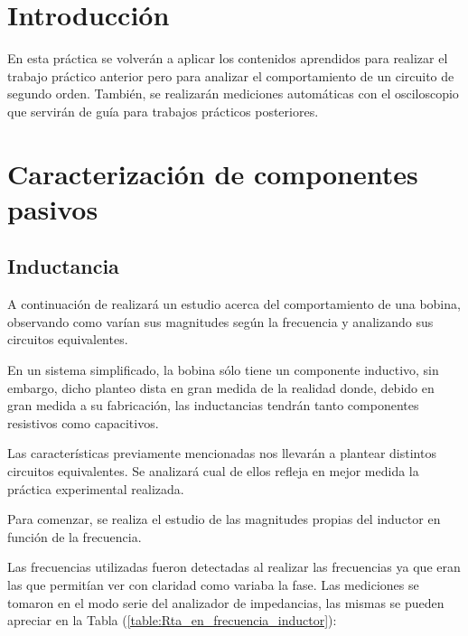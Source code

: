 \documentclass[11pt, a4paper]{article}
\begin{document}




\section{Introducción}
En esta práctica se volverán a aplicar los contenidos aprendidos para realizar el trabajo práctico anterior pero para analizar el comportamiento de un circuito de segundo orden. También, se realizarán mediciones automáticas con el osciloscopio que servirán de guía para trabajos prácticos posteriores.

\section{Caracterización de componentes pasivos}

\subsection{Inductancia}
A continuación de realizará un estudio acerca del comportamiento de una bobina, observando como varían sus magnitudes según la frecuencia y analizando sus circuitos equivalentes.\par En un sistema simplificado, la bobina sólo tiene un componente inductivo, sin embargo, dicho planteo dista en gran medida de la realidad donde, debido en gran medida a su fabricación, las inductancias tendrán tanto componentes resistivos como capacitivos. \par Las características previamente mencionadas nos llevarán a plantear distintos circuitos equivalentes. Se analizará cual de ellos refleja en mejor medida la práctica experimental realizada.

Para comenzar, se realiza el estudio de las magnitudes propias del inductor en función de la frecuencia. \par Las frecuencias utilizadas fueron detectadas al realizar las frecuencias ya que eran las que permitían ver con claridad como variaba la fase. Las mediciones se tomaron en el modo serie del analizador de impedancias, las mismas se pueden apreciar en la Tabla (\ref{table:Rta_en_frecuencia_inductor}):
\end{document}
